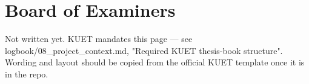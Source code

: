 \chapter*{Board of Examiners}

\begin{draftnote}
Not written yet. KUET mandates this page --- see logbook/08\_project\_context.md,
"Required KUET thesis-book structure". Wording and layout should be copied from
the official KUET template once it is in the repo.
\end{draftnote}
